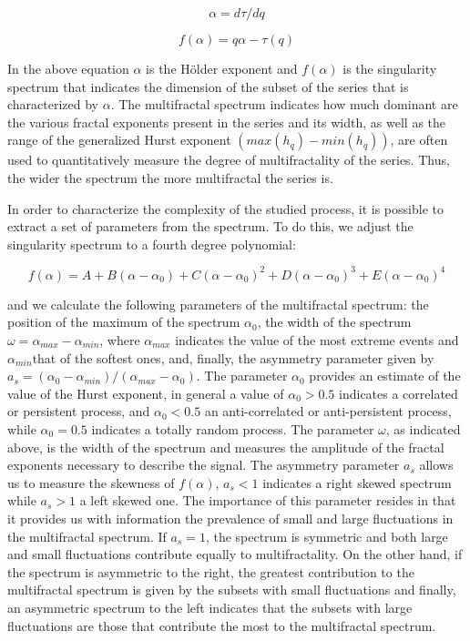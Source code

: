 \documentclass[onecolumn, preprint,aps,amsmath, amssymb, superscriptaddress]{revtex4}
\begin{document}
\begin{equation}
\alpha=d\tau/dq
\end{equation}

\begin{equation}
f(\alpha)=q\alpha-\tau(q)
\end{equation}

In the above equation $\alpha$ is the H\"older exponent and $f(\alpha)$ is the singularity spectrum that indicates the dimension of the subset of the series that is characterized by $\alpha$. The multifractal spectrum indicates how much dominant are the various fractal exponents present in the series and its width, as well as the range of the generalized Hurst exponent $(max(h_q)-min (h_q))$, are often used to quantitatively measure the degree of multifractality of the series. Thus, the wider the spectrum the more multifractal the series is.

In order to characterize the complexity of the studied process, it is possible to extract a set of parameters from the spectrum. To do this, we adjust the singularity spectrum to a fourth degree polynomial:

\begin{equation}
f(\alpha) =  A + B(\alpha - \alpha_0) + C(\alpha - \alpha_0)^2 + D(\alpha - \alpha_0)^3 + E(\alpha - \alpha_0)^4
\end{equation}

and we calculate the following parameters of the multifractal spectrum: the position of the maximum of the spectrum $\alpha_0$, the width of the spectrum $\omega = \alpha_{max}-\alpha_{min}$, where $\alpha_{max}$ indicates the value of the most extreme events and $\alpha_{min}$that of the softest ones, and, finally, the asymmetry parameter given by $a_s = (\alpha_0-\alpha_{min})/(\alpha_{max}-\alpha_0)$. The parameter $\alpha_0$ provides an estimate of the value of the Hurst exponent, in general a value of $\alpha_0 > 0.5$ indicates a correlated or persistent process, and $\alpha_0 < 0.5$ an anti-correlated or anti-persistent process, while $\alpha_0 = 0.5$ indicates a totally random process. The parameter $\omega$, as indicated above, is the width of the spectrum and measures the amplitude of the fractal exponents necessary to describe the signal. The asymmetry parameter $a_s$ allows us to measure the skewness of $f(\alpha)$, $a_s<1$ indicates a right skewed spectrum while $a_s>1$ a left skewed one. The importance of this parameter resides in that it provides us with information  the prevalence of small and large fluctuations in the multifractal spectrum. If $a_s = 1$, the spectrum is symmetric and both large and small fluctuations contribute equally to multifractality. On the other hand, if the spectrum is asymmetric to the right, the greatest contribution to the multifractal spectrum is given by the subsets with small fluctuations and finally, an asymmetric spectrum to the left indicates that the subsets with large fluctuations are those that contribute the most to the multifractal spectrum.
\end{document}
